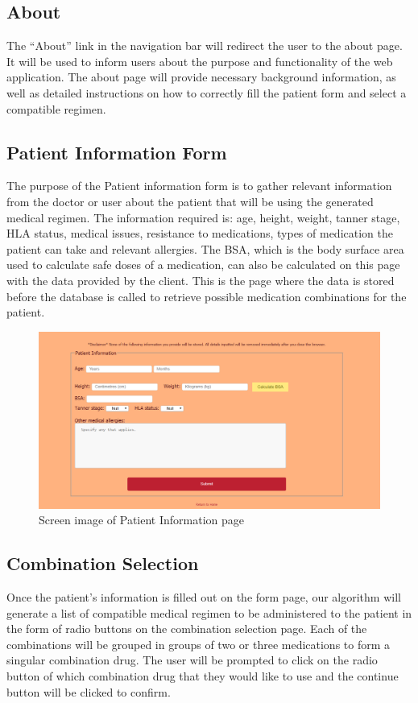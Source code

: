 \documentclass[12pt]{article}
\begin{document}
\subsection{About}
The “About” link in the navigation bar will redirect the user to the about page. It will be used to inform users about the purpose and functionality of the web application. The about page will provide necessary background information, as well as detailed instructions on how to correctly fill the patient form and select a compatible regimen.

\subsection{Patient Information Form}
The purpose of the Patient information form is to gather relevant information from the doctor or user about the patient that will be using the generated medical regimen. The information required is: age, height, weight, tanner stage, HLA status, medical issues, resistance to medications, types of medication the patient can take and relevant allergies. The BSA, which is the body surface area used to calculate safe doses of a medication, can also be calculated on this page with the data provided by the client. This is the page where the data is stored before the database is called to retrieve possible medication combinations for the patient.

\begin{figure}[H]
  \centering
  \includegraphics[width=\linewidth]{form1.png}
 \caption{Screen image of Patient Information page}
  \label{fig:form1}
\end{figure}

\subsection{Combination Selection}
Once the patient's information is filled out on the form page, our algorithm will generate a list of compatible medical regimen to be administered to the patient in the form of radio buttons on the combination selection page. Each of the combinations will be grouped in groups of two or three medications to form a singular combination drug. The user will be prompted to click on the radio button of which combination drug that they would like to use and the continue button will be clicked to confirm.
\end{document}
